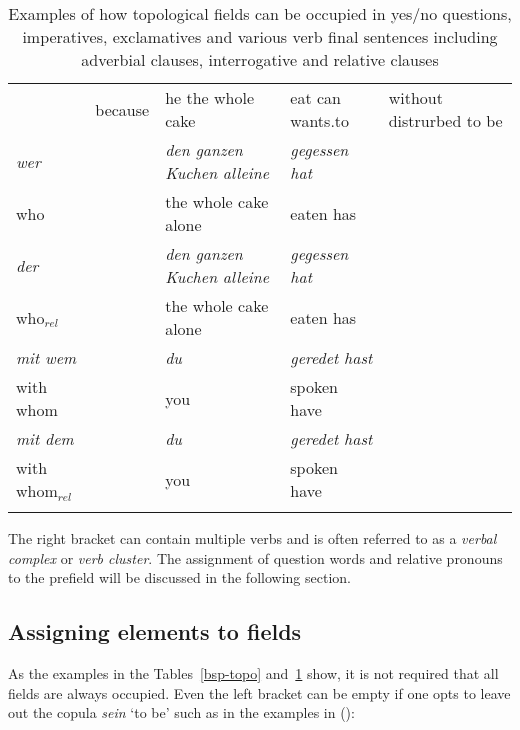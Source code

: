 \begin{table}
{\begin{tabular}{l@{~}l@{~}l@{~}l@{~}l}
        & because       & he the whole cake                 & eat can wants.to    & without distrurbed to be\\\tablevspace
%
\emph{wer}     &               & \emph{den ganzen Kuchen alleine}                  & \emph{gegessen hat} \\
who     &               & the whole cake alone              & eaten has\\\tablevspace
%
\emph{der}     &               & \emph{den ganzen Kuchen alleine}                  & \emph{gegessen hat} \\
who$_{rel}$     &               & the whole cake alone              & eaten has\\\tablevspace
%
\emph{mit wem} &               & \emph{du}                                     & \emph{geredet hast}\\
with whom &             & you                                    & spoken have\\\tablevspace
%
\emph{mit dem} &               & \emph{du}                                     & \emph{geredet hast}\\
with whom$_{rel}$ &             & you                                    & spoken have\\\lspbottomrule
\end{tabular}
}
\caption{\label{bsp-topo-two}Examples of how topological fields can be occupied in yes/no questions,
  imperatives, exclamatives and various verb final sentences including adverbial clauses,
  interrogative and relative clauses}
\end{table}
The right bracket can contain multiple verbs and is often referred to as a \emph{verbal complex} or \emph{verb cluster}.
The assignment of question words and relative pronouns to the prefield will be discussed in the following section.

\subsection{Assigning elements to fields}

As the examples in the Tables~\ref{bsp-topo} and~\ref{bsp-topo-two} show, it is not required that all fields are always occupied. Even the left bracket can be empty if one opts to leave out
the copula \emph{sein} `to be' such as in the examples in ():
\eal
\ex

